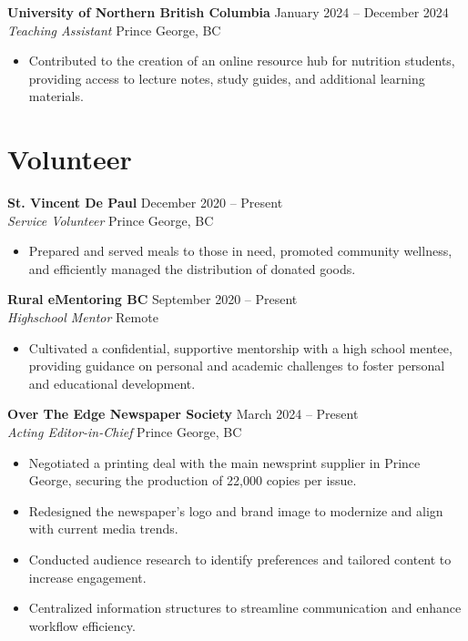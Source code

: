 \documentclass[11pt]{article}
\begin{document}
\vspace{8pt}

\noindent\textbf{University of Northern British Columbia} \hfill January 2024 – December 2024 \\
\textit{Teaching Assistant} \hfill Prince George, BC
\begin{itemize}[leftmargin=*, topsep=2pt, itemsep=1pt, parsep=0pt]
\item Contributed to the creation of an online resource hub for nutrition students, providing access to lecture notes, study guides, and additional learning materials.
\end{itemize}

\section{Volunteer}

\vspace{4pt}

\noindent\textbf{St. Vincent De Paul} \hfill December 2020 – Present \\
\textit{Service Volunteer} \hfill Prince George, BC
\begin{itemize}[leftmargin=*, topsep=2pt, itemsep=1pt, parsep=0pt]
\item Prepared and served meals to those in need, promoted community wellness, and efficiently managed the distribution of donated goods.
\end{itemize}

\vspace{8pt}

\noindent\textbf{Rural eMentoring BC} \hfill September 2020 – Present \\
\textit{Highschool Mentor} \hfill Remote
\begin{itemize}[leftmargin=*, topsep=2pt, itemsep=1pt, parsep=0pt]
\item Cultivated a confidential, supportive mentorship with a high school mentee, providing guidance on personal and academic challenges to foster personal and educational development.
\end{itemize}

\vspace{8pt}

\noindent\textbf{Over The Edge Newspaper Society} \hfill March 2024 – Present \\
\textit{Acting Editor-in-Chief} \hfill Prince George, BC
\begin{itemize}[leftmargin=*, topsep=2pt, itemsep=1pt, parsep=0pt]
\item Negotiated a printing deal with the main newsprint supplier in Prince George, securing the production of 22,000 copies per issue.
\item Redesigned the newspaper's logo and brand image to modernize and align with current media trends.
\item Conducted audience research to identify preferences and tailored content to increase engagement.
\item Centralized information structures to streamline communication and enhance workflow efficiency.
\end{itemize}
\end{document}

